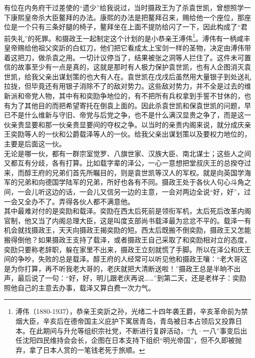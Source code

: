 有位在内务府干过差使的“遗少”给我说过，当时摄政王为了杀袁世凯，曾想照学一下康熙皇帝杀大臣鳌拜的办法。康熙的办法是把鳌拜召来，赐给他一个座位，那座位是一个只有三条好腿的椅子，鳌拜坐在上面不提防给闪了一下，因此构成了“君前失礼”的死罪。和摄政王一起制定这个计划的是小恭亲王溥伟\footnote{溥伟（1880-1937），恭亲王奕訢之孙，光绪二十四年袭王爵，辛亥革命前为禁烟大臣，辛亥后在德帝国主义庇护下寓居青岛，青岛被日本占领后又投靠日本。在此期间与升允等组织宗社党，不断进行复辟活动，“九·一八”事变后出任沈阳四民维持会会长，企图在日本支持下组织“明光帝国”，但不久即被抛弃，拿了日本人赏的一笔钱老死于旅顺。}。溥伟有一柄咸丰皇帝赐给他祖父奕訢的白虹刀，他们把它看成太上宝剑一样的圣物，决定由溥伟带着这把刀，做杀袁之用。一切计议停当了，结果被张之洞等人拦住了。这件未可置信的故事至少有一点是真的，这就是那时有人极力保护袁世凯，也有人企图消灭袁世凯，给我父亲出谋划策的也大有人在。袁世凯在戊戌后虽然用大量银子到处送礼拉拢，但毕竟还有用银子消除不了的敌对势力。这些敌对势力，并不全是过去的维新派和帝党人物，其中有和奕劻争地位的，有不把所有兵权拿到手誓不甘休的，也有为了其他目的而把希望寄托在倒袁上面的。因此杀袁世凯和保袁世凯的问题，早已不是什么维新与守旧、帝党与后党之争，也不是什么满汉显贵之争了，而是这一伙亲贵显要和那一伙亲贵显要间的夺权之争。以当时的亲贵内阁来说，就分成庆亲王奕劻等人的一伙和公爵载泽等人的一伙。给我父亲出谋划策以及要权力地位的，主要是后面这一伙。\\

无论是哪一伙，都有一群宗室觉罗、八旗世家、汉族大臣、南北谋士；这些人之间又都互有分歧，各有打算。比如载字辈的泽公，一心一意想把堂叔庆王的总揆夺过来，而醇王府的兄弟们首先所瞩目的，则是袁世凯等汉人的军权。就是向英国学海军的兄弟和向德国学陆军的兄弟，所好也各有不同。摄政王处于各伙人句心斗角之间，一会儿听这边的话，一会儿又信另一边的主意，一会对两边全说“好，好”，过一会又全办不了。弄得各伙人都不满意他。\\

其中最难对付的是奕劻和载泽。奕劻在西太后死前是领衔军机，太后死后改革内阁官制，他又当了内阁总理大臣，这是叫度支部尚书载泽最为忿忿不平的。载泽一有机会就找摄政王，天天向摄政王揭奕劻的短。西太后既搬不倒奕劻，摄政王又怎能搬得倒他？如果摄政王支持了载泽，或者摄政王自己采取了和奕劻相对立的态度，奕劻只要称老辞职，躲在家里不出来，摄政王立刻就慌了手脚。所以在泽公和庆王间的争吵，失败的总是载泽。醇王府的人经常可以听见他和摄政王嚷：“老大哥这是为你打算，再不听我老大哥的，老庆就把大清断送啦！”摄政王总是半晌不出声，最后说了一句：“好，好，明儿跟老庆再说……”到第二天，还是老样子：奕劻照他自己的主意去办事，载泽又算白费一次力气。\\

